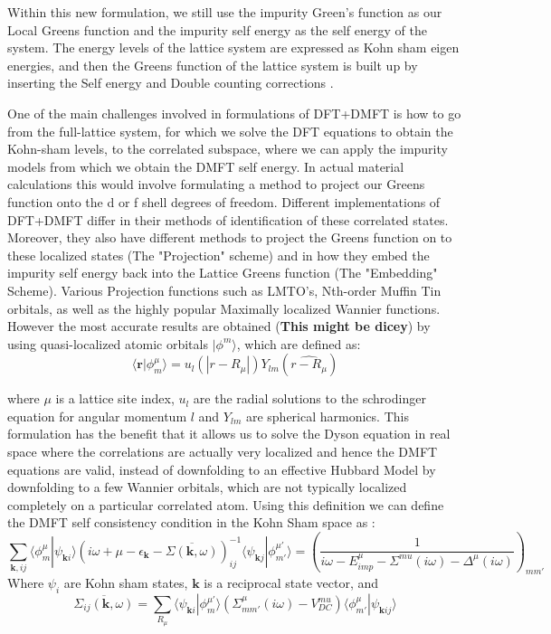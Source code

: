 \documentclass[12pt,letter]{article}
\newcommand{\la}{\langle}
\newcommand{\ra}{\rangle}
\newcommand{\rmb}{\mathbf{r}}
\begin{document}
 Within this new formulation, we still use the impurity Green's function as our Local Greens function and the impurity self energy as the self energy of the system. The energy levels of the lattice system are expressed as Kohn sham eigen energies, and then the Greens function of the lattice system is built up by inserting the Self energy and Double counting corrections . 
 
One of the main challenges involved in formulations of DFT+DMFT is how to go from the full-lattice system, for which we solve the DFT equations to obtain the Kohn-sham levels, to the correlated subspace, where we can apply the impurity models from which we obtain the DMFT self energy. In actual material calculations this would involve formulating a method to project our Greens function onto the d or f shell degrees of freedom. Different implementations of DFT+DMFT differ in their methods of identification of these correlated states. Moreover, they also have different methods to project the Greens function on to these localized states (The "Projection" scheme) and in how they embed the impurity self energy back into the Lattice Greens function (The "Embedding" Scheme). Various Projection functions such as LMTO's, Nth-order Muffin Tin orbitals, as well as the highly popular Maximally localized Wannier functions. However the most accurate results are obtained (\textbf{This might be dicey}) by using quasi-localized atomic orbitals $|\phi^m \ra$, which are defined as:
\begin{equation}
\la \rmb |\phi_m^\mu \ra= u_l(|r-R_\mu|) Y_{lm}(\widehat{r-R_\mu})
\end{equation}

where $\mu$ is a lattice site index, $u_l$ are the radial solutions to the schrodinger equation for angular momentum $l$ and  $Y_{lm}$ are spherical harmonics. This formulation has the benefit that it allows us to solve the Dyson equation in real space where the correlations are actually very localized and hence the DMFT equations are valid, instead of downfolding to an effective Hubbard Model by  downfolding to a few Wannier orbitals, which are not typically localized completely on a particular correlated atom. Using this definition we can define the  DMFT self consistency condition in the Kohn Sham space as :
\begin{equation}
\sum_{\mathbf{k},ij} \la \phi^\mu_m|\psi_{\mathbf{k} i} \ra \left( i\omega +\mu -\epsilon_{\mathbf{k}} -\overline{\Sigma(\mathbf{k} ,\omega)} \right)^{-1}_{ij}\la\psi_{\mathbf{k} j}  |\phi^{\mu'}_{m'} \ra = \left( \dfrac{1}{i\omega -E^{\mu}_{imp}-\Sigma^{mu}(i\omega)-\Delta^{\mu}(i\omega)} \right) _{mm'}
\end{equation}
Where $\psi_i$ are Kohn sham states, $\mathbf{k}$ is a reciprocal state vector, and 
\begin{equation}
\overline{\Sigma_{ij}(\mathbf{k} ,\omega)}= \sum_{R_\mu} \la\psi_{\mathbf{k} i}  |\phi^{\mu'}_{m} \ra (\Sigma^{\mu}_{mm'} (i\omega) -V^{mu}_{DC} )\la \phi^\mu_{m'}|\psi_{\mathbf{k} ij} \ra
\end{equation}
\end{document}
